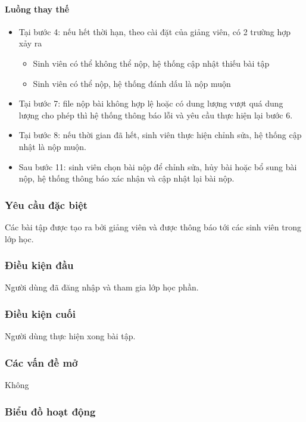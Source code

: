 \documentclass[./../main_file.tex]{subfiles}
\begin{document}
\paragraph{Luồng thay thế}
\begin{itemize}
	\item Tại bước 4: nếu hết thời hạn, theo cài đặt của giảng viên, có 2 trường hợp xảy ra
	\begin{itemize}
		\item Sinh viên có thể không thể nộp, hệ thống cập nhật thiếu bài tập
		\item Sinh viên có thể nộp, hệ thống đánh dấu là nộp muộn
	\end{itemize}
	
	\item Tại bước 7: file nộp bài không hợp lệ hoặc có dung lượng vượt quá dung lượng cho phép thì hệ thống thông báo lỗi và yêu cầu thực hiện lại bước 6.
	\item Tại bước 8: nếu thời gian đã hết, sinh viên thực hiện chỉnh sửa, hệ thống cập nhật là nộp muộn.
	\item Sau bước 11: sinh viên chọn bài nộp để chỉnh sửa, hủy bài hoặc bổ sung bài nộp, hệ thống thông báo xác nhận và cập nhật lại bài nộp.
	
\end{itemize}
\subsubsection{Yêu cầu đặc biệt}
Các bài tập được tạo ra bởi giảng viên và được thông báo tới các sinh viên trong lớp học.

\subsubsection{Điều kiện đầu}
Người dùng đã đăng nhập và tham gia lớp học phần.

\subsubsection{Điều kiện cuối}
Người dùng thực hiện xong bài tập.

\subsubsection{Các vấn đề mở}
Không

\subsubsection{Biểu đồ hoạt động}
\end{document}
